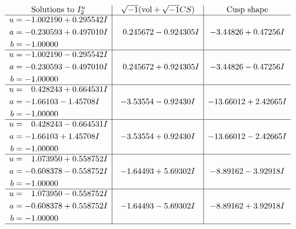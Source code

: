 \documentclass[1p]{elsarticle_modified}
\theoremstyle{definition}
\newcommand{\I}{\sqrt{-1}}
\begin{document}
$$\begin{array}{c|c|c}  
\text{Solutions to }I^u_{2}& \I (\text{vol} + \sqrt{-1}CS) & \text{Cusp shape}\\
 \hline 
\begin{aligned}
u &= -1.002190 + 0.295542 I \\
a &= -0.230593 + 0.497010 I \\
b &= -1.00000\phantom{ +0.000000I}\end{aligned}
 & \phantom{-}0.245672 - 0.924305 I & -3.44826 + 0.47256 I \\ \hline\begin{aligned}
u &= -1.002190 - 0.295542 I \\
a &= -0.230593 - 0.497010 I \\
b &= -1.00000\phantom{ +0.000000I}\end{aligned}
 & \phantom{-}0.245672 + 0.924305 I & -3.44826 - 0.47256 I \\ \hline\begin{aligned}
u &= \phantom{-}0.428243 + 0.664531 I \\
a &= -1.66103 - 1.45708 I \\
b &= -1.00000\phantom{ +0.000000I}\end{aligned}
 & -3.53554 - 0.92430 I & -13.66012 + 2.42665 I \\ \hline\begin{aligned}
u &= \phantom{-}0.428243 - 0.664531 I \\
a &= -1.66103 + 1.45708 I \\
b &= -1.00000\phantom{ +0.000000I}\end{aligned}
 & -3.53554 + 0.92430 I & -13.66012 - 2.42665 I \\ \hline\begin{aligned}
u &= \phantom{-}1.073950 + 0.558752 I \\
a &= -0.608378 - 0.558752 I \\
b &= -1.00000\phantom{ +0.000000I}\end{aligned}
 & -1.64493 + 5.69302 I & -8.89162 - 3.92918 I \\ \hline\begin{aligned}
u &= \phantom{-}1.073950 - 0.558752 I \\
a &= -0.608378 + 0.558752 I \\
b &= -1.00000\phantom{ +0.000000I}\end{aligned}
 & -1.64493 - 5.69302 I & -8.89162 + 3.92918 I\\
 \hline 
 \end{array}$$\newpage\newpage\renewcommand{\arraystretch}{1}
\end{document}
